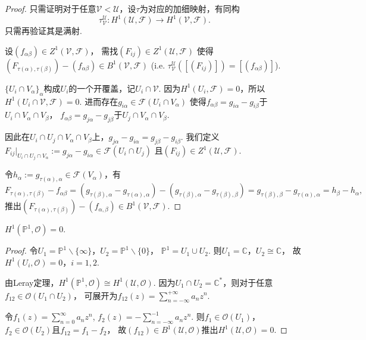 \begin{proof}
	只需证明对于任意$\mathscr{V}<\mathscr{U}$，设$\tau$为对应的加细映射，有同构
	$$\tau^\mathscr{U}_\mathscr{V}\colon
    H^1(\mathscr{U}, \mathscr{F})\rightarrow H^1(\mathscr{V}, \mathscr{F}).$$
	只需再验证其是满射.

	设$(f_{\alpha \beta})\in Z^1(\mathscr{V}, \mathscr{F})$，
    需找$(F_{ij})\in Z^1(\mathscr{U}, \mathscr{F})$
    使得$(F_{\tau(\alpha), \tau(\beta)})-(f_{\alpha \beta})\in B^1(\mathscr{V}, \mathscr{F})$
    (i.e. $\tau^\mathscr{U}_\mathscr{V}([(F_{ij})])=[(f_{\alpha\beta})]$).

	$\{U_i\cap V_\alpha\}_\alpha$构成$U_i$的一个开覆盖，记$U_i\cap \mathscr{V}$. 
    因为$H^1(U_i, \mathscr{F})=0$，所以$H^1(U_i\cap \mathscr{V},\mathscr{F})=0$. 
    进而存在$g_{i\alpha}\in \mathscr{F}(U_i\cap V_\alpha)$
    使得$f_{\alpha\beta}=g_{i\alpha}-g_{i\beta}$于$U_i\cap V_\alpha \cap V_\beta$，
    $f_{\alpha\beta}=g_{j\alpha}-g_{j\beta}$于$U_j\cap V_\alpha \cap V_\beta$.

	因此在$U_i\cap U_j\cap V_\alpha\cap V_\beta$上，$g_{j\alpha}-g_{i\alpha}=g_{j\beta}-g_{i\beta}$. 
    我们定义$F_{ij}|_{U_i\cap U_j \cap V_\alpha}:=g_{j\alpha}-g_{i\alpha}\in \mathscr{F}(U_i\cap U_j)$
    且$(F_{ij})\in Z^1(\mathscr{U}, \mathscr{F})$.

	令$h_\alpha:=g_{\tau(\alpha),\alpha}\in \mathscr{F}(V_\alpha)$，有
	$$F_{\tau(\alpha),\tau(\beta)}-f_{\alpha\beta}
    =(g_{\tau(\beta),\alpha}-g_{\tau(\alpha),\alpha})-(g_{\tau(\beta),\alpha}-g_{\tau(\beta),\beta})
    =g_{\tau(\beta),\beta}-g_{\tau(\alpha),\alpha}=h_\beta-h_\alpha,$$
	推出$(F_{\tau(\alpha),\tau(\beta)})-(f_{\alpha,\beta})\in B^1(\mathscr{V},\mathscr{F})$.
\end{proof}
		
\begin{theorem}
	$H^1(\mathbb{P}^1,\mathcal{O})=0$.
\end{theorem}
		
\begin{proof}
	令$U_1=\mathbb{P}^1\backslash \{\infty\}$，$U_2=\mathbb{P}^1\backslash \{0\}$，
    $\mathbb{P}^1=U_1\cup U_2$. 则$U_1=\mathbb{C}$，$U_2\cong \mathbb{C}$，
    故$H^1(U_i, \mathcal{O})=0$，$i=1,2$.

	由Leray定理，$H^1(\mathbb{P}^1,\mathcal{O})\cong H^1(\mathscr{U},\mathcal{O})$. 
    因为$U_1\cap U_2=\mathbb{C}^*$，则对于任意$f_{12}\in \mathcal{O}(U_1\cap U_2)$，
    可展开为$f_{12}(z)=\sum\limits_{n=-\infty}^{+\infty} a_nz^n$.

	令$f_1(z)=\sum\limits_{n=0}^\infty a_nz^n$, $f_2(z)=-\sum\limits_{n=-\infty}^{-1} a_nz^n$. 
    则$f_1\in \mathcal{O}(U_1)$，$f_2\in \mathcal{O}(U_2)$且$f_{12}=f_1-f_2$，
    故$(f_{12})\in B^1(\mathscr{U},\mathcal{O})$推出$H^1(\mathscr{U}, \mathcal{O})=0$.
\end{proof}
		
